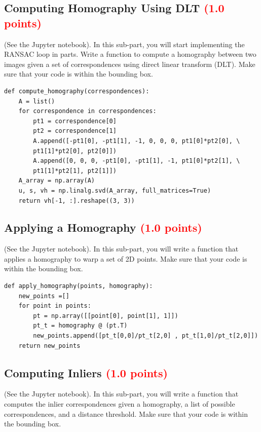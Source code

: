 \documentclass[answers]{exam}
\newcommand{\mypoints}[1]{\textcolor{red}{(#1 points)}}
\begin{document}
\subsection{Computing Homography Using DLT \mypoints{1.0}}
(See the Jupyter notebook). In this sub-part, you will start implementing the RANSAC loop in parts. Write a function to compute a homography between two images given a set of correspondences using direct linear transform (DLT). Make sure that your code is within the bounding box.

\begin{solution}
\begin{verbatim}
def compute_homography(correspondences):
    A = list()
    for correspondence in correspondences:
        pt1 = correspondence[0]
        pt2 = correspondence[1]
        A.append([-pt1[0], -pt1[1], -1, 0, 0, 0, pt1[0]*pt2[0], \
        pt1[1]*pt2[0], pt2[0]])
        A.append([0, 0, 0, -pt1[0], -pt1[1], -1, pt1[0]*pt2[1], \
        pt1[1]*pt2[1], pt2[1]])
    A_array = np.array(A)
    u, s, vh = np.linalg.svd(A_array, full_matrices=True)
    return vh[-1, :].reshape((3, 3))
\end{verbatim}
\end{solution}

\subsection{Applying a Homography \mypoints{1.0}}
(See the Jupyter notebook). In this sub-part, you will write a function that applies a homography to warp a set of 2D points. Make sure that your code is within the bounding box.

\begin{solution}
\begin{verbatim}
def apply_homography(points, homography):
    new_points =[]
    for point in points:
        pt = np.array([[point[0], point[1], 1]])
        pt_t = homography @ (pt.T)
        new_points.append([pt_t[0,0]/pt_t[2,0] , pt_t[1,0]/pt_t[2,0]])
    return new_points

\end{verbatim}
\end{solution}

\subsection{Computing Inliers \mypoints{1.0}}
(See the Jupyter notebook). In this sub-part, you will write a function that computes the inlier correspondences given a homography, a list of possible correspondences, and a distance threshold. Make sure that your code is within the bounding box.
\end{document}
